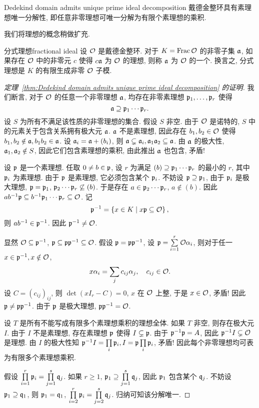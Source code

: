 \begin{theorem}{}{Dedekind domain admits unique prime ideal decomposition}
	戴德金整环具有素理想唯一分解性, 即任意非零理想可唯一分解为有限个素理想的乘积.
\end{theorem}

我们将理想的概念稍做扩充.

\begin{definition}{分式理想}{fractional ideal}
	设 $\CO$ 是戴德金整环. 对于 $K=\Fr \CO$ 的非零子集 $\fa$, 如果存在 $\CO$ 中的非零元 $c$ 使得 $c\fa$ 为 $\CO$ 的理想, 则称 $\fa$ 为 $\CO$ 的一个. 换言之, 分式理想是 $K$ 的有限生成非零 $\CO$ 子模.
\end{definition}

\begin{proof}[定理~\ref{thm:Dedekind domain admits unique prime ideal decomposition} 的证明]
	我们断言, 对于 $\CO$ 的任意一个非零理想 $\fa$, 均存在非零素理想 $\fp_1,\dots,\fp_r$ 使得 
	\[\fa\supseteq \fp_1\cdots\fp_r.\]
	设 $S$ 为所有不满足该性质的非零理想的集合. 假设 $S$ 非空. 由于 $\CO$ 是诺特的, $S$ 中的元素关于包含关系拥有极大元 $\fa$. $\fa$ 不是素理想, 因此存在 $b_1,b_2\in\CO$ 使得 $b_1,b_2\notin\fa,b_1b_2\in\fa$. 设 $\fa_i=\fa+(b_i)$, 则 $\fa\subsetneq \fa_i,\fa_1\fa_2\subseteq \fa$. 由 $\fa$ 的极大性, $\fa_1,\fa_2\notin S$, 因此它们包含素理想的乘积, 由此推出 $\fa$ 也包含, 矛盾!

	设 $\fp$ 是一个素理想. 任取 $0\neq b\in\fp$, 设 $r$ 为满足 $(b)\supseteq \fp_1\cdots\fp_r$ 的最小的 $r$, 其中 $\fp_i$ 为素理想. 由于 $\fp$ 是素理想, 它必须包含某个 $\fp_i$. 不妨设 $\fp\supseteq \fp_1$, 由于 $\fp_i$ 是极大理想, $\fp=\fp_1$, $\fp_2\cdots\fp_r\not\subseteq (b)$. 于是存在 $a\in\fp_2\cdots\fp_r$, $a\notin(b)$. 因此 $ab^{-1}\fp\subseteq b^{-1}\fp_1\cdots\fp_r\subseteq \CO$.
	记
	\[\fp^{-1}=\set{x\in K \mid x\fp\subseteq\CO},\]
	则 $ab^{-1}\in\fp^{-1}$. 因此 $\fp^{-1}\neq\CO$. 

	显然 $\CO\subseteq \fp^{-1}$, $\fp\subseteq\fp\fp^{-1}\subseteq\CO$. 假设 $\fp=\fp\fp^{-1}$, 设 $\fp=\suml_{i=1}^r \CO \alpha_i$, 则对于任一 $x\in\fp^{-1},x\notin \CO$,
	\[x\alpha_i=\sum_j c_{ij} \alpha_j,\quad c_{ij}\in \CO.\]
	设 $C=(c_{ij})_{ij}$, 则 $\det(xI_r-C)=0$, $x$ 在 $\CO$ 上整, 于是 $x\in \CO$, 矛盾! 因此 $\fp\neq \fp\fp^{-1}$. 由于 $\fp$ 是极大理想, $\fp\fp^{-1}=\CO$. 

	设 $T$ 是所有不能写成有限多个素理想乘积的理想全体. 如果 $T$ 非空, 则存在极大元 $I$. 由于 $I$ 不是素理想, 存在素理想 $\fp$ 使得 $I\subsetneq \fp$.
	由于 $\fp^{-1}\fp=A$, 因此 $\fp^{-1}I\subsetneq\CO$ 是理想. 由 $I$ 的极大性知 $\fp^{-1}I=\prod\limits_i \fp_i, I=\fp\prod\limits_i \fp_i$, 矛盾! 因此每个非零理想均可表为有限多个素理想乘积.

	假设 $\prod\limits_{i=1}^r\fp_i=\prod\limits_{j=1}^s \fq_j$. 如果 $r\ge 1$, $\fp_1\supseteq \prod\limits_{j=1}^s \fq_j$, 因此 $\fp_1$ 包含某个 $\fq_j$. 不妨设 $\fp_1\supseteq \fq_1$, 则 $\fp_1=\fq_1$, $\prod\limits_{i=2}^r\fp_i=\prod\limits_{j=2}^s \fq_j$. 归纳可知该分解唯一.
\end{proof}

